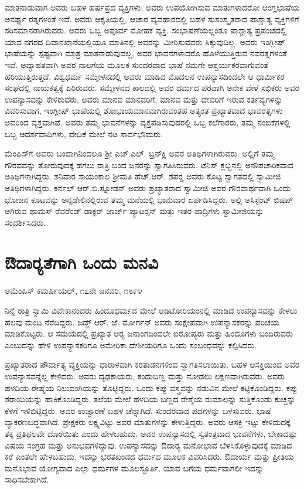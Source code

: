  ಮಾತನಾಡುವಾಗ ಅವರು ಬಹಳ ಹರ್ಷಪ್ರದ ವ್ಯಕ್ತಿಗಳು. ಅವರು ಉಪಯೋಗಿಸುವ ಮಾತುಗಳಾದರೋ ಆಂಗ್ಲಭಾಷೆಯ ಅನರ್ಘ್ಯ ರತ್ನಗಳಂತೆ ಇವೆ. ಅವರು ಆಕೃತಿಯಲ್ಲಿ, ಆಚಾರ ವ್ಯವಹಾರದಲ್ಲಿ ಬಹಳ ಸುಸಂಸ್ಕೃತರಾದ ಪಾಶ್ಚಾತ್ಯ ವ್ಯಕ್ತಿಗಳಿಗೆ ಸರಿಸಮಾನರಾಗಿರುವರು. ಅವರು ಒಬ್ಬ ಅಪೂರ್ವ ಮೋಹಕ ವ್ಯಕ್ತಿ. ಸಂಭಾಷಣೆಯಲ್ಲಂತೂ ಪಾಶ್ಚಾತ್ಯ ಪ್ರಪಂಚದಲ್ಲಿ ಯಾವ ನಗರದ ದಿವಾನಖಾನೆಯಲ್ಲಿಯೂ ಮಾತಿನಲ್ಲಿ ಅವರನ್ನು ಮೀರಿಸುವವರು ಸಿಕ್ಕುವುದಿಲ್ಲ. ಅವರು ಇಂಗ್ಲೀಷ್ ಭಾಷೆಯನ್ನು ಸ್ಪಷ್ಟವಾಗಿ ಮಾತ್ರ ಮಾತನಾಡುವುದಲ್ಲ, ಅವರ ಭಾವನೆಗಳಾದರೊ ಹೊಳೆಯುತ್ತಿರುವ ನವರತ್ನಗಳಂತೆ ಇವೆ. ಅವ್ಯಾಹತವಾಗಿ ಅವರ ನಾಲಗೆಯ ಮೂಲಕ ಸುಂದರವಾದ ಭಾಷೆ ನಮಗೇ ಆಶ್ಚರ್ಯಕರವಾಗುವಂತೆ ಹರಿಯುತ್ತಿರುತ್ತದೆ. ವಿಶ್ವಧರ್ಮ ಸಮ್ಮೇಳನದಲ್ಲಿ ಅವರು ಮಾಡಿದ ಮೊದಲನೆ ಉಪನ್ಯಾಸದಿಂದಲೇ ಆ ಧಾರ್ಮಿಕರ ಸಂಘದಲ್ಲಿ ನಾಯಕತ್ವಕ್ಕೆ ಏರಿರುವರು. ಸಮ್ಮೇಳನದ ಕಾಲದಲ್ಲಿ ಅವರ ಧರ್ಮದ ಪರವಾಗಿ ಅನೇಕ ವೇಳೆ ಸಭಿಕರು ಅವರ ಉಪನ್ಯಾಸವನ್ನು ಕೇಳಿರುವರು. ಅವರು ಮಾನವ ಮಾನವರಿಗೆ, ಮಾನವ ಮತ್ತು ದೇವರಿಗೆ ಇರುವ ಕರ್ತವ್ಯಗಳನ್ನು ವಿವರಿಸುವಾಗ, ಇಂಗ್ಲೀಷ್ ಭಾಷೆಯಲ್ಲಿ ಶೋಭಾಯಮಾನವಾಗಿರುವಂತಹ ಅತ್ಯಂತ ಪ್ರಖ್ಯಾತವಾದ ಭಾವರತ್ನಗಳು ಅವರಿಂದ ವ್ಯಕ್ತವಾಗಿವೆ. ಅವರು ತಮ್ಮ ಭಾವನೆಗಳನ್ನು ವ್ಯಕ್ತಪಡಿಸುವುದರಲ್ಲಿ ಒಬ್ಬ ಕಲೆಗಾರರು, ತಮ್ಮ ನಂಬಿಕೆಗಳಲ್ಲಿ ಒಬ್ಬ ಆದರ್ಶವಾದಿಗಳು, ವೇದಿಕೆ ಮೇಲೆ ನಟ ಸಾರ್ವಭೌಮರು. 

 ಮೆಂಪಿಸ್‍ಗೆ ಅವರು ಬಂದಾಗಿನಿಂದಲೂ ಶ‍್ರೀ ಎಚ್.ಎಲ್. ಬ್ರನ್‍ಕ್ಲಿ ಅವರ ಅತಿಥಿಗಳಾಗಿರುವರು. ಅಲ್ಲಿಗೆ ತಮ್ಮ ಗೌರವವನ್ನು ತೋರುವುದಕ್ಕೆ ಹಗಲು ರಾತ್ರಿ ಬಂದ ಜನರನ್ನು ಸ್ವಾಗತಿಸಿರುವರು. ಟೆನಿಸ್ ಕ್ಲಬ್ಬಿನಲ್ಲಿ ಅನೌಪಚಾರಿಕವಾದ ಅತಿಥಿಗಳಾಗಿದ್ದರು. ಶನಿವಾರ ಸಾಯಂಕಾಲ ಶ‍್ರೀಮತಿ ಹೆಚ್.ಆರ್. ಶಪರ‍್ಡ ಅವರು ಕೊಟ್ಟ ಸ್ವಾಗತದಲ್ಲಿ ಸ್ವಾಮೀಜಿ ಅತಿಥಿಗಳಾಗಿದ್ದರು. ಕರ್ನಲ್ ಆರ್.ಬಿ.ಸ್ನೋಡನ್ ಅವರು ಪ್ರಖ್ಯಾತರಾದ ಸ್ವಾಮೀಜಿ ಅವರ ಗೌರವಾರ್ಥವಾಗಿ ಒಂದು ಭೋಜನ ಕೂಟವನ್ನು ಅನ್ಸ‍ಡೇಲಿನಲ್ಲಿರುವ ತಮ್ಮ ಮನೆಯಲ್ಲಿ ಭಾನುವಾರ ಏರ್ಪಡಿಸಿದ್ದರು. ಅಲ್ಲಿ ಅಸಿಸ್ಟೆಂಟ್ ಬಿಷಪ್ ಆಗಿರುವ ಥಾಮಸ್ ರೆವರೆಂಡ್ ಡಾಕ್ಟರ್ ಜಾರ್ಜ್ ಪ್ಯಾಟರ್‍ಸನ್ ಮತ್ತು ಇತರ ಪಾದ್ರಿಗಳು ಸ್ವಾಮೀಜಿಯನ್ನು ಸಂದರ್ಶಿಸಿದರು.


\section*{ಔದಾರ‍್ಯತೆಗಾಗಿ ಒಂದು ಮನವಿ}

\begin{flushright}
ಅಮೆಂಪಿಸ್ ಕಮರ್ಷಿಯಲ್, ೧೭ನೇ ಜನವರಿ, ೧೮೯೪ 
\end{flushright}

 ನಿನ್ನೆ ರಾತ್ರಿ ಸ್ವಾಮಿ ವಿವೇಕಾನಂದರು ಹಿಂದೂಧರ್ಮದ ಮೇಲೆ ಆಡಿಟೋರಿಯಂನಲ್ಲಿ ಮಾಡಿದ ಉಪನ್ಯಾಸವನ್ನು ಕೇಳಲು ಹಲವು ಮಂದಿ ನೆರೆದಿದ್ದರು. ಜಡ್ಜ್ ಆರ್. ಜೆ. ಮೋರ್ಗನ್ ಅವರು ಸಂಕ್ಷೇಪವಾಗಿ ಉಪನ್ಯಾಸಕರನ್ನು ಪರಿಚಯ ಮಾಡಿಕೊಟ್ಟರು. ಆ ಸಮಯದಲ್ಲಿ ಪ್ರಖ್ಯಾತ ಆರ‍್ಯ ಜನಾಂಗದಿಂದಲೇ ಐರೋಪ್ಯರು ಮತ್ತು ಹಿಂದೂಗಳು ಬಂದಿರುವರು ಎಂಬುದನ್ನು ಹೇಳಿ ಉಪನ್ಯಾಸಕರಿಗೂ ಅಮೇರಿಕಾ ದೇಶೀಯರಿಗೂ ಒಂದು ಸಂಬಂಧವನ್ನು ಕಲ್ಪಿಸಿದರು. 

 ಪ್ರಖ್ಯಾತರಾದ ಪೌರ್ವಾತ್ಯ ವ್ಯಕ್ತಿಯನ್ನು ಧಾರಾಳವಾಗಿ ಕರತಾಡನಗಳಿಂದ ಸ್ವಾಗತಿಸಲಾಯಿತು. ಬಹಳ ಆಸಕ್ತಿಯಿಂದ ಅವರ ಉಪನ್ಯಾಸವನ್ನೆಲ್ಲ ಕೇಳಿದರು. ಅವರು ದೃಢಕಾಯರು, ಕಂದುಬಣ್ಣ ಮತ್ತು ನೋಡಲು ಲಕ್ಷಣವಾಗಿರುವರು. ಅವರು ಹಳದಿಯ ರೇಷ್ಮೆಯ ನಿಲುವಂಗಿಯನ್ನು ತೊಟ್ಟಿದ್ದರು. ಒಂದು ಕಪ್ಪು ವಸ್ತ್ರವನ್ನು ನಡುವಿನ ಮೇಲೆ ಕಟ್ಟಿಕೊಂಡಿದ್ದರು. ಕಪ್ಪು ಶರಾಯಿಯನ್ನು ಹಾಕಿಕೊಂಡಿದ್ದರು. ತಲೆಯ ಮೇಲೆ ಹಳದಿಯ ಬಣ್ಣದ ರೇಶ್ಮೆಯ ರುಮಾಲನ್ನು ಸುತ್ತಿಕೊಂಡು ಕುಚ್ಚನ್ನು ಕೆಳಗೆ ಇಳಿಬಿಟ್ಟಿದ್ದರು. ಅವರ ಉಚ್ಚಾರಣೆ ಬಹಳ ಚೆನ್ನಾಗಿದೆ. ಸುಂದರವಾದ ಪದಗಳನ್ನು ಬಳಸುವರು. ಭಾಷೆ ವ್ಯಾಕರಣಬದ್ಧವಾಗಿದೆ. ಪ್ರೇಕ್ಷಕರು ಲಕ್ಷ್ಯವಿಟ್ಟು ಅವರ ಮಾತುಗಳನ್ನು ಕೇಳುತ್ತಿದ್ದರು. ಅವರು ಆಸಕ್ತಿ ಇಟ್ಟು ಕೇಳಿದುದಕ್ಕೆ ತಕ್ಕ ಪ್ರತಿಫಲವೇ ದೊರೆಯಿತು ಎಂದು ಹೇಳಬಹುದು. ಅವರ ಉಪನ್ಯಾಸದಲ್ಲಿ ಸ್ವತಂತ್ರವಾದ ಭಾವನೆಗಳು, ಬೇಕಾದಷ್ಟು ವಿಷಯ ಸಂಗ್ರಹ ಮತ್ತು ಅನುಭವಗಳಿದ್ದುವು. ಉಪನ್ಯಾಸವನ್ನು ಔದಾರ‍್ಯ ಮನೋಭಾವ ಬೆಳಸಿಕೊಳ್ಳುವುದಕ್ಕೆ ಮಾಡಿದ ಕರೆ ಎಂತಲೇ ಹೇಳಬಹುದು. ಇದನ್ನು ಭರತಖಂಡದ ಧರ್ಮದ ಮೂಲಕ ವಿವರಿಸಿದರು. ಔದಾರ್ಯ ಮತ್ತು ಪ್ರೀತಿಯ ಮನೊಭಾವ ಯೋಗ್ಯವಾದ ಎಲ್ಲಾ ಧರ್ಮಗಳ ಮೂಲಸ್ಫೂರ್ತಿ. ಯಾವ ಬಗೆಯ ಧರ್ಮವಾಗಲೀ ಇದನ್ನು ಸಾಧಿಸಬೇಕಾಗಿದೆ. 

